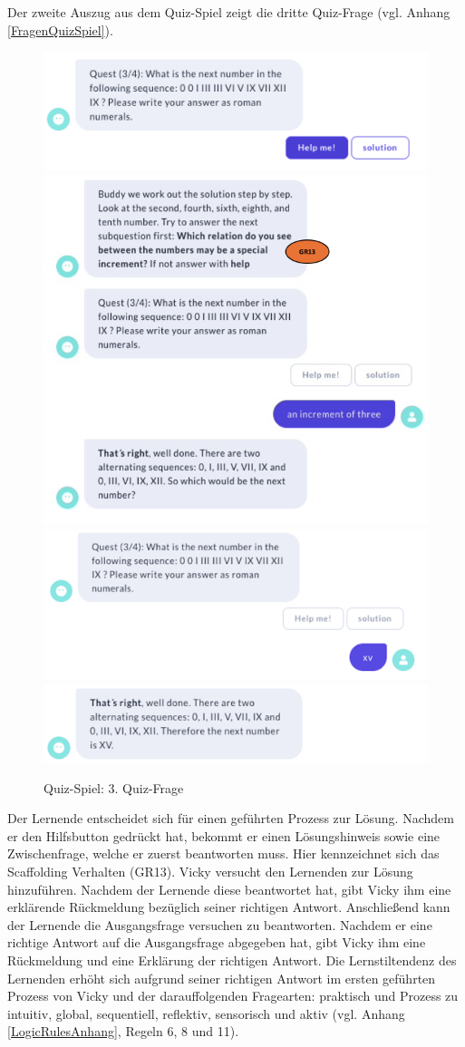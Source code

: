 Der zweite Auszug aus dem Quiz-Spiel zeigt die dritte Quiz-Frage (vgl. Anhang \ref{FragenQuizSpiel}).
\begin{figure}[H]
  \centering
  \includegraphics[width=0.7\linewidth]{images/VickyQuiz/Q2.2.png}
  \includegraphics[width=0.7\linewidth]{images/Game/q3.01.png}
  \includegraphics[width=0.7\linewidth]{images/VickyQuiz/q4.1.png}
  \includegraphics[width=0.7\linewidth]{images/VickyQuiz/q4.2.png}
  \caption[Quiz-Spiel: 3. Quiz-Frage]{Quiz-Spiel: 3. Quiz-Frage}
  \label{fig:3._Quiz-Frage}
\end{figure}  


Der Lernende entscheidet sich für einen geführten Prozess zur Lösung.
Nachdem er den Hilfsbutton gedrückt hat, bekommt er einen Lösungshinweis 
sowie eine Zwischenfrage, welche er zuerst beantworten muss. Hier kennzeichnet sich das Scaffolding Verhalten (GR13). Vicky versucht den Lernenden zur Lösung hinzuführen. 
Nachdem der Lernende diese beantwortet hat, gibt Vicky ihm 
eine erklärende Rückmeldung bezüglich seiner richtigen Antwort. Anschließend kann der Lernende 
die Ausgangsfrage versuchen zu beantworten. 
Nachdem er eine 
richtige Antwort auf die Ausgangsfrage abgegeben hat, 
gibt Vicky ihm eine Rückmeldung und eine Erklärung der richtigen Antwort.
Die Lernstiltendenz des Lernenden erhöht sich aufgrund seiner richtigen Antwort 
im ersten geführten Prozess von Vicky und der darauffolgenden Fragearten: praktisch und Prozess zu 
intuitiv, global, sequentiell, reflektiv, sensorisch und aktiv (vgl. Anhang \ref{LogicRulesAnhang}, Regeln 6, 8 und 11).

